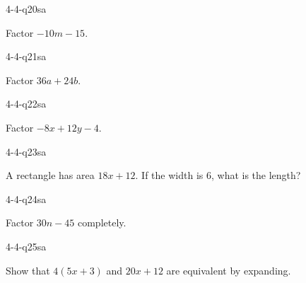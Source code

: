 \begin{practiceQuestion}{4-4-q20}{sa}
\begin{questionText}
Factor $-10m - 15$.
\end{questionText}
\end{practiceQuestion}

\begin{practiceQuestion}{4-4-q21}{sa}
\begin{questionText}
Factor $36a + 24b$.
\end{questionText}
\end{practiceQuestion}

\begin{practiceQuestion}{4-4-q22}{sa}
\begin{questionText}
Factor $-8x + 12y - 4$.
\end{questionText}
\end{practiceQuestion}

\begin{practiceQuestion}{4-4-q23}{sa}
\begin{questionText}
A rectangle has area $18x + 12$. If the width is $6$, what is the length?
\end{questionText}
\end{practiceQuestion}

\begin{practiceQuestion}{4-4-q24}{sa}
\begin{questionText}
Factor $30n - 45$ completely.
\end{questionText}
\end{practiceQuestion}

\begin{practiceQuestion}{4-4-q25}{sa}
\begin{questionText}
Show that $4(5x + 3)$ and $20x + 12$ are equivalent by expanding.
\end{questionText}
\end{practiceQuestion}


